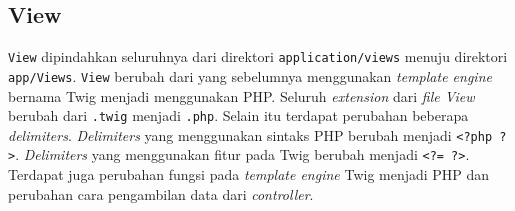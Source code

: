 \subsection{View}
\texttt{View} dipindahkan seluruhnya dari direktori \texttt{application/views} menuju direktori \texttt{app/Views}. \texttt{View} berubah dari yang sebelumnya menggunakan \textit{template engine} bernama Twig menjadi menggunakan PHP. Seluruh \textit{extension} dari \textit{file View} berubah dari \texttt{.twig} menjadi \texttt{.php}. Selain itu terdapat perubahan beberapa \textit{delimiters}. \textit{Delimiters} yang menggunakan sintaks PHP berubah menjadi \texttt{<?php ?>}. \textit{Delimiters} yang menggunakan fitur pada Twig berubah menjadi \texttt{<?= ?>}. Terdapat juga perubahan fungsi pada \textit{template engine} Twig menjadi PHP dan perubahan cara pengambilan data dari \textit{controller}.

